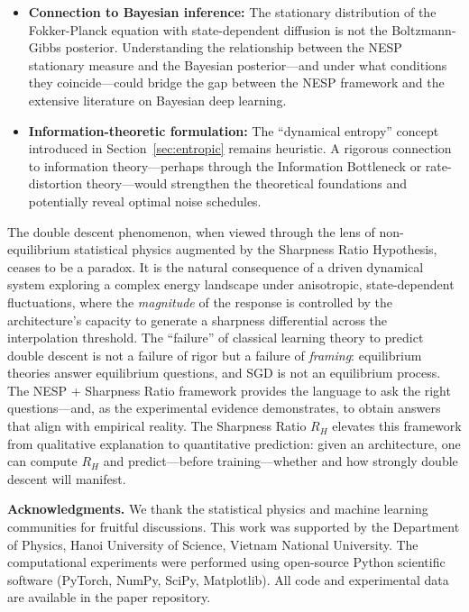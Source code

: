 \documentclass[
  journal=largetwo,
  simfonts=false,
  year=2025,
  volume=37,
]{cup-journal}
\begin{document}
\begin{itemize}
    \item \textbf{Connection to Bayesian inference:} The stationary distribution of the Fokker-Planck equation with state-dependent diffusion is not the Boltzmann-Gibbs posterior. Understanding the relationship between the NESP stationary measure and the Bayesian posterior---and under what conditions they coincide---could bridge the gap between the NESP framework and the extensive literature on Bayesian deep learning.

    \item \textbf{Information-theoretic formulation:} The ``dynamical entropy'' concept introduced in Section~\ref{sec:entropic} remains heuristic. A rigorous connection to information theory---perhaps through the Information Bottleneck or rate-distortion theory---would strengthen the theoretical foundations and potentially reveal optimal noise schedules.
\end{itemize}

The double descent phenomenon, when viewed through the lens of non-equilibrium statistical physics augmented by the Sharpness Ratio Hypothesis, ceases to be a paradox. It is the natural consequence of a driven dynamical system exploring a complex energy landscape under anisotropic, state-dependent fluctuations, where the \textit{magnitude} of the response is controlled by the architecture's capacity to generate a sharpness differential across the interpolation threshold. The ``failure'' of classical learning theory to predict double descent is not a failure of rigor but a failure of \textit{framing}: equilibrium theories answer equilibrium questions, and SGD is not an equilibrium process. The NESP + Sharpness Ratio framework provides the language to ask the right questions---and, as the experimental evidence demonstrates, to obtain answers that align with empirical reality. The Sharpness Ratio $R_H$ elevates this framework from qualitative explanation to quantitative prediction: given an architecture, one can compute $R_H$ and predict---before training---whether and how strongly double descent will manifest.

\vspace{12pt}
\noindent\textbf{Acknowledgments.} We thank the statistical physics and machine learning communities for fruitful discussions. This work was supported by the Department of Physics, Hanoi University of Science, Vietnam National University. The computational experiments were performed using open-source Python scientific software (PyTorch, NumPy, SciPy, Matplotlib). All code and experimental data are available in the paper repository.
\end{document}
